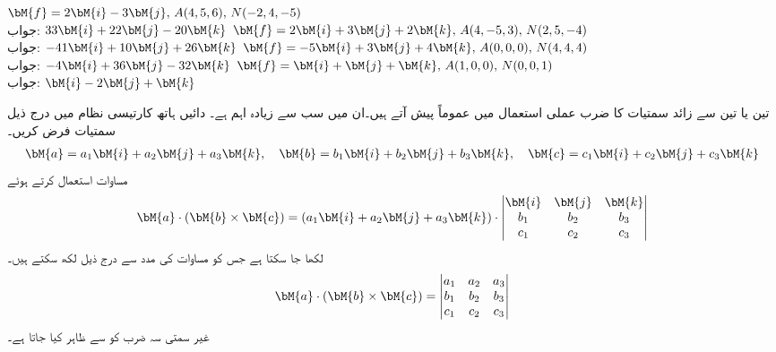  \quad
$\bM{f}=2\bM{i}-3\bM{j},\, A(4,5,6),\, N(-2,4,-5)$\\
جواب:
$33\bM{i}+22\bM{j}-20\bM{k}$
\quad
$\bM{f}=2\bM{i}+3\bM{j}+2\bM{k},\, A(4,-5,3),\, N(2,5,-4)$\\
جواب:
$-41\bM{i}+10\bM{j}+26\bM{k}$
\quad
$\bM{f}=-5\bM{i}+3\bM{j}+4\bM{k},\, A(0,0,0),\, N(4,4,4)$\\
جواب:
$-4\bM{i}+36\bM{j}-32\bM{k}$
\quad
$\bM{f}=\bM{i}+\bM{j}+\bM{k},\, A(1,0,0),\, N(0,0,1)$\\
جواب:
$\bM{i}-2\bM{j}+\bM{k}$

تین یا تین سے زائد سمتیات کا ضرب عملی استعمال میں عموماً پیش آتے ہیں۔ان میں سب سے زیادہ اہم 
  ہے۔ دائیں ہاتھ کارتیسی نظام میں درج ذیل سمتیات فرض کریں۔
\begin{align*}
\bM{a}=a_1\bM{i}+a_2\bM{j}+a_3\bM{k}, \quad \bM{b}=b_1\bM{i}+b_2\bM{j}+b_3\bM{k},\quad \bM{c}=c_1\bM{i}+c_2\bM{j}+c_3\bM{k}
\end{align*}
مساوات  استعمال کرتے ہوئے
\begin{align*}
\bM{a}\cdot(\bM{b}\times \bM{c})=(a_1\bM{i}+a_2\bM{j}+a_3\bM{k})\cdot\begin{vmatrix}\bM{i}&\bM{j}&\bM{k}\\b_1&b_2&b_3\\c_1&c_2&c_3  \end{vmatrix}
\end{align*}
لکھا جا سکتا ہے جس کو مساوات  کی مدد سے درج ذیل لکھ سکتے ہیں۔
\begin{align}\label{مساوات_الجبرا_غیر_سمتی_سہ_ضرب_الف}
\bM{a}\cdot(\bM{b}\times \bM{c})=\begin{vmatrix}a_1&a_2&a_3\\b_1&b_2&b_3\\c_1&c_2&c_3  \end{vmatrix}
\end{align}
غیر سمتی سہ ضرب  کو  سے ظاہر کیا جاتا ہے۔

